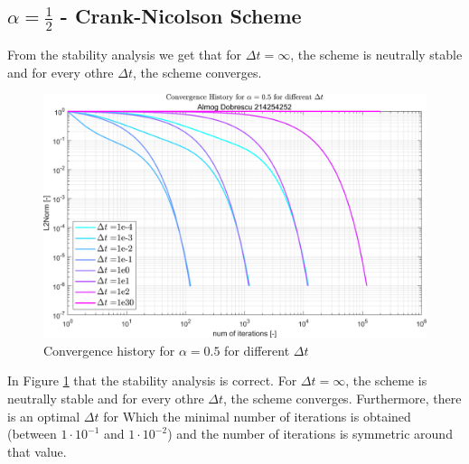 \documentclass[11pt, a4paper]{article}
\begin{document}
\newpage
\subsection{$\alpha = \frac{1}{2}$ - Crank-Nicolson Scheme}
From the stability analysis we get that for $\Delta t = \infty$, the scheme is neutrally stable and for every othre $\Delta t$, the scheme converges.
\begin{figure}[H]
    \centering
    \includegraphics[width=.8\textwidth]{images/grap3.png}
    \caption{Convergence history for $\alpha=0.5$ for different $\Delta t$}
    \label{fig3}
\end{figure}
\noindent In Figure \ref{fig3} that the stability analysis is correct. For $\Delta t = \infty$, the scheme is neutrally stable and for every othre $\Delta t$, the scheme converges. Furthermore, there is an optimal $\Delta t$ for Which the minimal number of iterations is obtained (between $1\cdot10^{-1}$ and $1\cdot10^{-2}$) and the number of iterations is symmetric around that value.
\end{document}
